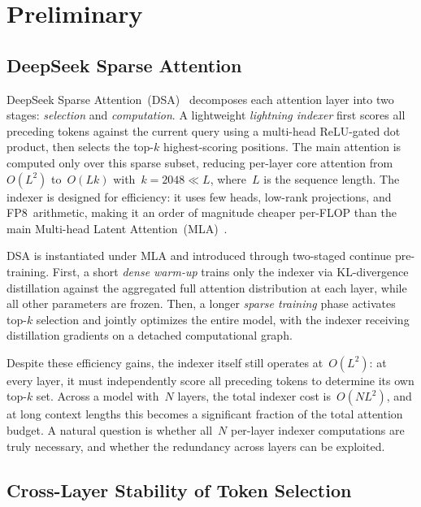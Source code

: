 \section{Preliminary}
\label{sec:background}

\subsection{DeepSeek Sparse Attention}
\label{sec:bg-dsa}

DeepSeek Sparse Attention~(DSA)~\citep{deepseekv32} decomposes each attention layer into two stages: \emph{selection} and \emph{computation}.
A lightweight \emph{lightning indexer} first scores all preceding tokens against the current query using a multi-head ReLU-gated dot product, then selects the top-$k$ highest-scoring positions.
The main attention is computed only over this sparse subset, reducing per-layer core attention from~$O(L^2)$ to~$O(Lk)$ with~$k{=}2048 \ll L$, where~$L$ is the sequence length.
The indexer is designed for efficiency: it uses few heads, low-rank projections, and FP8~arithmetic, making it an order of magnitude cheaper per-FLOP than the main Multi-head Latent Attention~(MLA)~\citep{deepseekv2}.

DSA is instantiated under MLA and introduced through two-staged continue pre-training.
First, a short \emph{dense warm-up} trains only the indexer via KL-divergence distillation against the aggregated full attention distribution at each layer, while all other parameters are frozen.
Then, a longer \emph{sparse training} phase activates top-$k$ selection and jointly optimizes the entire model, with the indexer receiving distillation gradients on a detached computational graph.

Despite these efficiency gains, the indexer itself still operates at~$O(L^2)$: at every layer, it must independently score all preceding tokens to determine its own top-$k$ set.
Across a model with~$N$ layers, the total indexer cost is~$O(NL^2)$, and at long context lengths this becomes a significant fraction of the total attention budget.
A natural question is whether all~$N$ per-layer indexer computations are truly necessary, and whether the redundancy across layers can be exploited.

\subsection{Cross-Layer Stability of Token Selection}
\label{sec:bg-stability}

